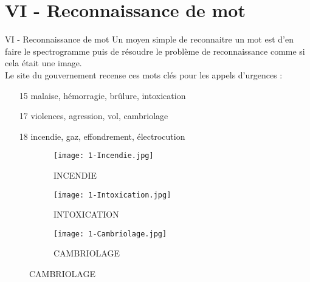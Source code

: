 
\section{VI - Reconnaissance de mot}
\begin{frame}{VI - Reconnaissance de mot}
Un moyen simple de reconnaitre un mot est d'en faire le spectrogramme puis de résoudre le problème de reconnaissance comme si cela était une image. \\
Le site du gouvernement recense ces mots clés pour les appels d'urgences : \\
\begin{enumerate}
  \item[15] malaise, hémorragie, brûlure, intoxication
  \item[17] violences, agression, vol, cambriolage
  \item[18] incendie, gaz, effondrement, électrocution
\end{enumerate}
\begin{figure}
	\begin{subfigure}[]{0.3\textwidth}
		\texttt{[image: 1-Incendie.jpg]}
  		\caption{INCENDIE}
	\end{subfigure}
	\begin{subfigure}[]{0.3\textwidth}
		\texttt{[image: 1-Intoxication.jpg]}
  		\caption{INTOXICATION}
	\end{subfigure}
	\begin{subfigure}[]{0.3\textwidth}
		\texttt{[image: 1-Cambriolage.jpg]}
		\caption{CAMBRIOLAGE}
	\end{subfigure}
\end{figure}
\end{frame}

